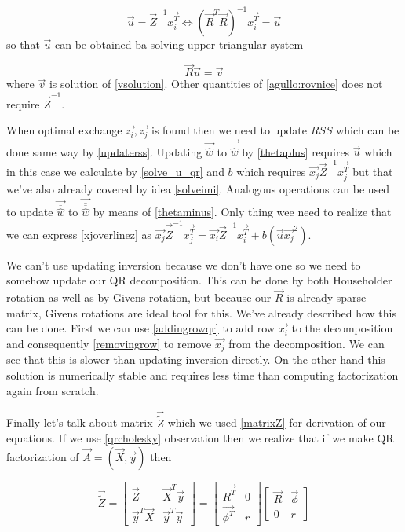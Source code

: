 \begin{equation}
	\vec{u} = \vec{Z}^{-1}\vec{x_i^T} 	\iff (\vec{R}^T\vec{R})^{-1}\vec{x_i^T} = \vec{u}
\end{equation}
so that $\vec{u}$ can be obtained ba solving upper triangular system 

\begin{equation} \label{solve_u_qr}
	\vec{R}\vec{u} = \vec{v}
\end{equation}
where $\vec{v}$ is solution of \ref{vsolution}. Other quantities of \ref{agullo:rovnice} does not require $\vec{Z}^{-1}$.

When optimal exchange $\vec{z_i}, \vec{z_j}$ is found then we need to update $RSS$ which can be done same way by \ref{updaterss}. Updating $\vec{\hat{w}}$ to  $\vec{\overline{\hat{w}}}$ by \ref{thetaplus} requires
$\vec{u}$  which in this case we calculate by \ref{solve_u_qr} and $b$ which requires  $\vec{x_j}\vec{Z}^{-1}\vec{x_j^T}$ but that we've also already covered by idea \ref{solveimi}. Analogous operations can be used to update $\vec{\overline{\hat{w}}}$ to $\vec{\overline{\overline{\hat{w}}}}$  by means of \ref{thetaminus}. Only thing wee need to realize that we can express \ref{xjoverlinez} as $\vec{x_j}\vec{\overline{{Z}}}^{-1}\vec{x_j^T} = \vec{x_i}\vec{{{Z}}}^{-1}\vec{x_i^T} + b(\vec{u}\vec{x_j}^2)$.

We can't use updating inversion because we don't have one so we need to somehow update our QR decomposition. This can be done by both Householder rotation as well as by Givens rotation, but because our $\vec{R}$ is already sparse matrix, Givens rotations are ideal tool for this. We've already described how this can be done. First we can use \ref{addingrowqr} to add row $\vec{x_i}$ to the decomposition and consequently \ref{removingrow} to remove $\vec{x_j}$  from the decomposition. We can see that this is slower than updating inversion directly. On the other hand this solution is numerically stable and requires less time than computing factorization again from scratch. 

Finally let's talk about matrix $\vec{\tilde{Z}}$ which we used \ref{matrixZ} for derivation of our equations. If we use \ref{qrcholesky} observation then we realize that if we make QR factorization of $\vec{A} = (\vec{X}, \vec{y})$ then

\begin{equation}
	\vec{\tilde{Z}} = 
	\begin{bmatrix}
		\vec{Z} & \vec{X}^T\vec{y} \\
    \vec{y}^T\vec{X} & \vec{y}^T\vec{y}
	\end{bmatrix} 
	= 
	\begin{bmatrix}
		\vec{R^T} & 0 \\
    \vec{\phi^T} & r
	\end{bmatrix} 
	\begin{bmatrix}
		\vec{R} & \vec{\phi} \\
     0 & r
	\end{bmatrix} 
\end{equation}

